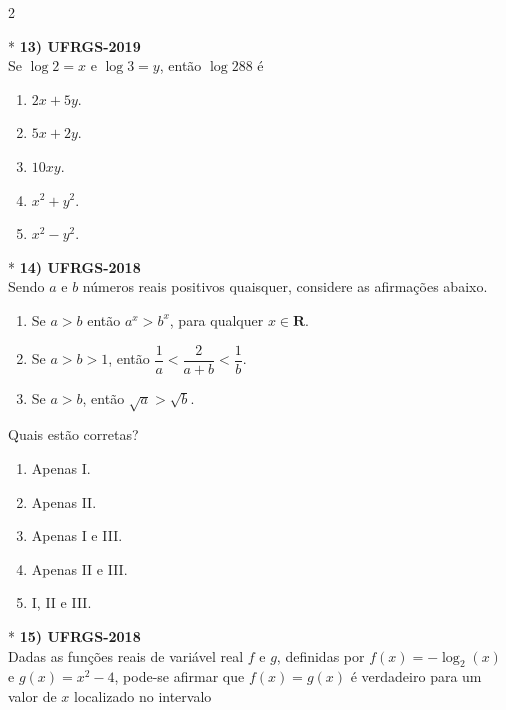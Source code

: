 \documentclass[11pt,a4paper]{article}
\begin{document}
\begin{paracol}{2}
\switchcolumn[1]
\vspace{8.5cm}

\switchcolumn[0]*
\textbf{13) UFRGS-2019} \\
Se $\log 2 = x$ e $\log 3 = y$, então $\log 288$ é

\begin{enumerate}[label=(\Alph*)]
    \item $2x + 5y$.
    \item $5x + 2y$.
    \item $10xy$.
    \item $x^2 + y^2$.
    \item $x^2 - y^2$.
\end{enumerate}
\vspace{0.4cm}

\switchcolumn[1]
\vspace{6cm}

\switchcolumn[0]*
\textbf{14) UFRGS-2018} \\
Sendo $a$ e $b$ números reais positivos quaisquer, considere as afirmações abaixo.

\begin{enumerate}[label=\Roman*., itemsep=0.2cm]
    \item Se $a > b$ então $a^x > b^x$, para qualquer $x \in \mathbf{R}$.
    \item Se $a > b > 1$, então $\dfrac{1}{a} < \dfrac{2}{a+b} < \dfrac{1}{b}$.
    \item Se $a > b$, então $\sqrt{a} > \sqrt{b}$.
\end{enumerate}

Quais estão corretas?

\begin{enumerate}[label=(\Alph*)]
    \item Apenas I.
    \item Apenas II.
    \item Apenas I e III.
    \item Apenas II e III.
    \item I, II e III.
\end{enumerate}
\vspace{0.4cm}

\switchcolumn[1]
\vspace{7.5cm}

\switchcolumn[0]*
\textbf{15) UFRGS-2018} \\
Dadas as funções reais de variável real $f$ e $g$, definidas por $f(x) = -\log_2(x)$ e $g(x) = x^2 - 4$, pode-se afirmar que $f(x) = g(x)$ é verdadeiro para um valor de $x$ localizado no intervalo


\end{paracol}
\end{document}

